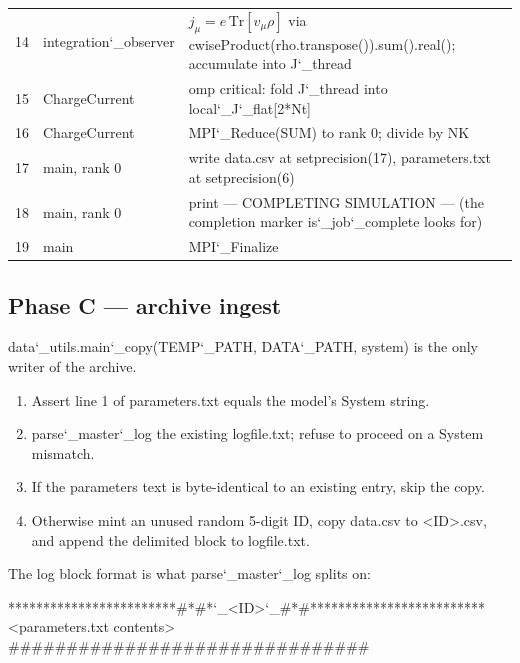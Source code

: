 \documentclass[11pt,a4paper]{article}
\newcommand{\code}[1]{{\ttfamily #1}}
\newcommand{\brk}{\discretionary{}{}{}}
\newcommand{\uu}{\char`_\brk}
\newcommand{\fn}[1]{{\ttfamily #1}}
\begin{document}
\begin{center}
\begin{tabular}{@{}r L{0.30\textwidth} L{0.55\textwidth}@{}}
14 & \fn{integration\uu observer}    & $j_\mu = e\,\mathrm{Tr}[v_\mu\rho]$ via \fn{cwiseProduct(rho.transpose()).sum().real()}; accumulate into \fn{J\uu thread} \\
15 & \fn{ChargeCurrent}              & \fn{omp critical}: fold \fn{J\uu thread} into \fn{local\uu J\uu flat[2*Nt]} \\
16 & \fn{ChargeCurrent}              & \fn{MPI\uu Reduce(SUM)} to rank 0; divide by \fn{NK} \\
17 & \fn{main}, rank 0               & write \code{data.csv} at \fn{setprecision(17)}, \code{parameters.txt} at \fn{setprecision(6)} \\
18 & \fn{main}, rank 0               & print \code{--- COMPLETING SIMULATION ---} (the completion marker \fn{is\uu job\uu complete} looks for) \\
19 & \fn{main}                       & \fn{MPI\uu Finalize} \\
\bottomrule
\end{tabular}
\end{center}

\subsection{Phase C --- archive ingest}

\fn{data\uu utils.main\uu copy(TEMP\uu PATH, DATA\uu PATH, system)} is the only
writer of the archive.

\begin{enumerate}[leftmargin=2.0em]
  \item Assert line 1 of \code{parameters.txt} equals the model's \fn{System} string.
  \item \fn{parse\uu master\uu log} the existing \code{logfile.txt}; refuse to proceed on a \fn{System} mismatch.
  \item If the parameters text is byte-identical to an existing entry, skip the copy.
  \item Otherwise mint an unused random 5-digit ID, copy \code{data.csv} to \code{<ID>.csv}, and append the delimited block to \code{logfile.txt}.
\end{enumerate}

\noindent The log block format is what \fn{parse\uu master\uu log} splits on:
\begin{center}\ttfamily\scriptsize
************************\#*\#*\uu <ID>\uu \#*\#*************************\\
<parameters.txt contents>\\
\#\#\#\#\#\#\#\#\#\#\#\#\#\#\#\#\#\#\#\#\#\#\#\#\#\#\#\#\#\#\#
\end{center}
\end{document}
